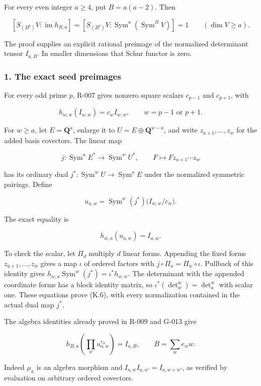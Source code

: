 \documentclass[
  10pt,
]{article}
\begin{document}
For every even integer \(a\ge4\), put \(B=a(a-2)\). Then

\[
\boxed{
[S_{(B^a)}V:\operatorname{im}h_{B,a}]
=[S_{(B^a)}V:\operatorname{Sym}^a(\operatorname{Sym}^BV)]
=1\qquad(\dim V\ge a).}
\tag{K.3}
\]

The proof supplies an explicit rational preimage of the normalized
determinant tensor \(I_{a,B}\). In smaller dimensions that Schur functor
is zero.

\subsubsection{1. The exact seed
preimages}\label{the-exact-seed-preimages}

For every odd prime \(p\), R-007 gives nonzero square scalars
\(c_{p-1}\) and \(c_{p+1}\), with

\[
h_{w,w}(I_{w,w})=c_w I_{w,w},
\qquad w=p-1\text{ or }p+1.
\]

For \(w\ge a\), let \(E=\mathbf Q^a\), enlarge it to
\(U=E\oplus\mathbf Q^{w-a}\), and write \(z_{a+1},\ldots,z_w\) for the
added basis covectors. The linear map

\[
j:\operatorname{Sym}^aE^*\longrightarrow\operatorname{Sym}^wU^*,
\qquad F\longmapsto Fz_{a+1}\cdots z_w
\tag{K.4}
\]

has its ordinary dual \(j^*:\operatorname{Sym}^wU\to
\operatorname{Sym}^aE\) under the normalized symmetric pairings. Define

\[
u_{a,w}=\operatorname{Sym}^w(j^*)\bigl(I_{w,w}/c_w\bigr).
\tag{K.5}
\]

The exact equality is

\[
h_{w,a}(u_{a,w})=I_{a,w}.
\tag{K.6}
\]

To check the scalar, let \(\Pi_d\) multiply \(d\) linear forms.
Appending the fixed forms \(z_{a+1},\ldots,z_w\) gives a map \(\iota\)
of ordered factors with \(j\circ\Pi_a=\Pi_w\circ\iota\). Pullback of
this identity gives \(h_{w,a}\operatorname{Sym}^w(j^*)=\iota^*h_{w,w}\).
The determinant with the appended coordinate forms has a block identity
matrix, so \(\iota^*(\det_w^w)=\det_a^w\) with scalar one. These
equations prove (K.6), with every normalization contained in the actual
dual map \(j^*\).

The algebra identities already proved in R-009 and G-013 give

\[
h_{B,a}\left(\prod_w u_{a,w}^{e_w}\right)
=I_{a,B},\qquad B=\sum_w e_w w.
\tag{K.7}
\]

Indeed \(\mu_a\) is an algebra morphism and
\(I_{a,w}I_{a,w'}=I_{a,w+w'}\), as verified by evaluation on arbitrary
ordered covectors.
\end{document}

